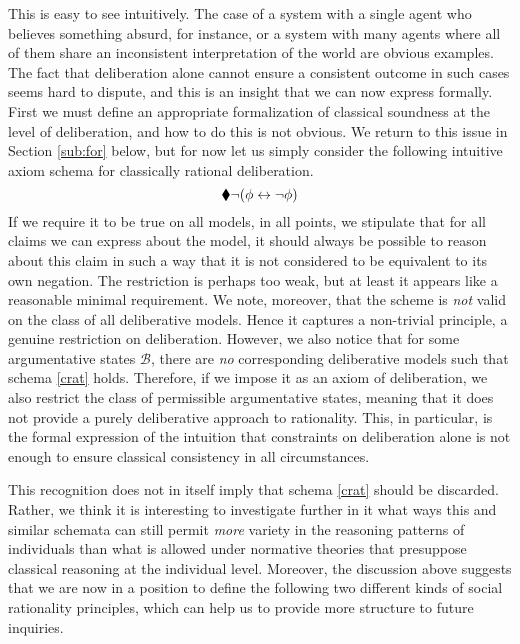 \documentclass[greybox]{svmult}
\newcommand{\views}{\mathcal B}
\begin{document}
This is easy to see intuitively. The case of a system with a single agent who believes something absurd, for instance, or a system with many agents where all of them share an inconsistent interpretation of the world are obvious examples. The fact that deliberation alone cannot ensure a consistent outcome in such cases seems hard to dispute, and this is an insight that we can now express formally. First we must define an appropriate formalization of classical soundness at the level of deliberation, and how to do this is not obvious. We return to this issue in Section \ref{sub:for} below, but for now let us simply consider the following intuitive axiom schema for classically rational deliberation.
\begin{equation}\label{crat}
\cdia \neg (\phi \leftrightarrow \neg \phi)
\end{equation}
If we require it to be true on all models, in all points, we stipulate that for all claims we can express about the model, it should always be possible to reason about this claim in such a way that it is not considered to be equivalent to its own negation. The restriction is perhaps too weak, but at least it appears like a reasonable minimal requirement. We note, moreover, that the scheme is \emph{not} valid on the class of all deliberative models. Hence it captures a non-trivial principle, a genuine restriction on deliberation. However, we also notice that for some argumentative states $\views$, there are \emph{no} corresponding deliberative models such that schema \ref{crat} holds. Therefore, if we impose it as an axiom of deliberation, we also restrict the class of permissible argumentative states, meaning that it does not provide a purely deliberative approach to rationality. This, in particular, is the formal expression of the intuition that constraints on deliberation alone is not enough to ensure classical consistency in all circumstances.

This recognition does not in itself imply that schema \ref{crat} should be discarded. Rather, we think it is interesting to investigate further in it what ways this and similar schemata can still permit \emph{more} variety in the reasoning patterns of individuals than what is allowed under normative theories that presuppose classical reasoning at the individual level. Moreover, the discussion above suggests that we are now in a position to define the following two different kinds of social rationality principles, which can help us to provide more structure to future inquiries.
\end{document}
